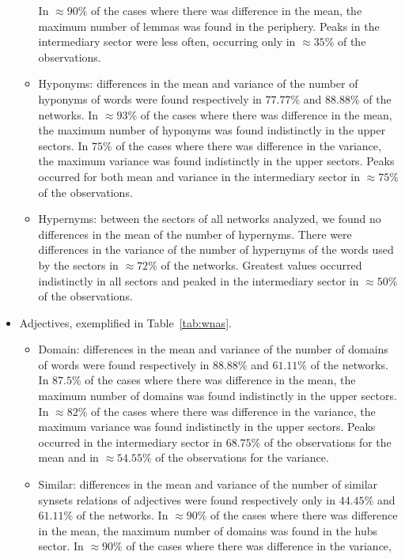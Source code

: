 \begin{itemize}
\begin{itemize}
				In $\approx 90\%$ of the cases where there was difference in the mean, the maximum number of lemmas was found in the periphery.
				Peaks in the intermediary sector were less often, occurring only in $\approx 35\%$ of the observations.
			\item Hyponyms:
				differences in the mean and variance of the number of hyponyms of words were found respectively in $77.77\%$ and $88.88\%$ of the networks.
				In $\approx 93\%$ of the cases where there was difference in the mean, 
				the maximum number of hyponyms was found indistinctly in the upper sectors.
				In $75\%$ of the cases where there was difference in the variance, 
				the maximum variance was found indistinctly in the upper sectors.
				Peaks occurred for both mean and variance in the intermediary sector in $\approx 75\%$ of the observations.
			\item Hypernyms:
				between the sectors of all networks analyzed, we found no differences in the mean of the number of hypernyms.
				There were differences in the variance of the number of hypernyms of the words used by the sectors in $\approx 72\%$ of the networks.
				Greatest values occurred indistinctly in all sectors and peaked in the intermediary sector in $\approx 50\%$ of the observations.

\FloatBarrier
		\end{itemize}
	\item Adjectives, exemplified in Table~\ref{tab:wnas}.
		\begin{itemize}
			\item Domain:
				differences in the mean and variance of the number of domains of words were found respectively in $88.88\%$ and $61.11\%$ of the networks.
				In $87.5\%$ of the cases where there was difference in the mean, 
				the maximum number of domains was found indistinctly in the upper sectors.
				In $\approx 82\%$ of the cases where there was difference in the variance, 
				the maximum variance was found indistinctly in the upper sectors.
				Peaks occurred in the intermediary sector in $68.75\%$ of the observations for the mean
				and in $\approx 54.55\%$ of the observations for the variance.
			\item Similar:
				differences in the mean and variance of the number of similar synsets relations of adjectives were found respectively only in $44.45\%$ and $61.11\%$ of the networks.
				In $\approx 90\%$ of the cases where there was difference in the mean, 
				the maximum number of domains was found in the hubs sector.
				In $\approx 90\%$ of the cases where there was difference in the variance, 

\end{itemize}
\end{itemize}
